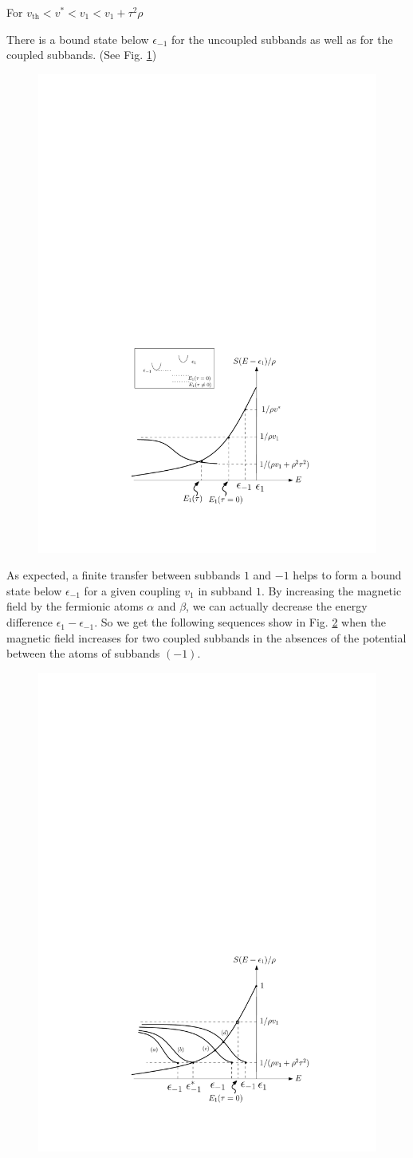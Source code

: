 \documentclass[11pt]{article} %
\begin{document}
For $v_{\text{th}}<v^{*}<v_1<v_1+\tau^2\rho$

There is a bound state below $\epsilon_{-1}$ for the uncoupled subbands as well as for the  coupled subbands.  (See Fig. \ref{fig:bound2})

\begin{figure}[htb]
	\centering
	       \includegraphics[width=.6\textwidth]{bound2}
			\caption{\label{fig:bound2}}
\end{figure}

As expected, a finite transfer between subbands $1$ and $-1$ helps to form a bound state below $\epsilon_{-1}$ for a given coupling $v_{1}$ in subband $1$. By increasing the magnetic field by the fermionic atoms $\alpha$ and $\beta$, we can actually decrease the energy difference $\epsilon_{1}-\epsilon_{-1}$. So we get the following sequences show in Fig. \ref{fig:seqS} when the magnetic field increases for two coupled subbands in the absences of the potential between the atoms of subbands $(-1)$.
\begin{figure}[htb]
	\centering
	       \includegraphics[width=.6\textwidth]{seqS}
			\caption{\label{fig:seqS}}
\end{figure}
\end{document}
